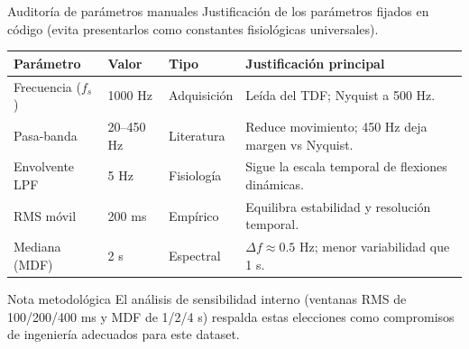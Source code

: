 \documentclass[10pt, aspectratio=169]{beamer}
\begin{document}
\begin{frame}{Auditoría de parámetros manuales}
\fontsize{8pt}{10pt}\selectfont
Justificación de los parámetros fijados en código (evita presentarlos como constantes fisiológicas universales).

\vspace{0.2cm}
\centering
\begin{tabular}{llll}
    \toprule
    \textbf{Parámetro} & \textbf{Valor} & \textbf{Tipo} & \textbf{Justificación principal} \\
    \midrule
    Frecuencia ($f_s$) & 1000 Hz & Adquisición & Leída del TDF; Nyquist a 500 Hz. \\
    Pasa-banda & 20--450 Hz & Literatura & Reduce movimiento; 450 Hz deja margen vs Nyquist. \\
    Envolvente LPF & 5 Hz & Fisiología & Sigue la escala temporal de flexiones dinámicas. \\
    RMS móvil & 200 ms & Empírico & Equilibra estabilidad y resolución temporal. \\
    Mediana (MDF) & 2 s & Espectral & $\Delta f \approx 0.5$ Hz; menor variabilidad que 1 s. \\
    \bottomrule
\end{tabular}

\vspace{0.4cm}
\begin{block}{Nota metodológica}
El análisis de sensibilidad interno (ventanas RMS de 100/200/400 ms y MDF de 1/2/4 s) respalda estas elecciones como compromisos de ingeniería adecuados para este dataset.
\end{block}
\end{frame}
\end{document}
